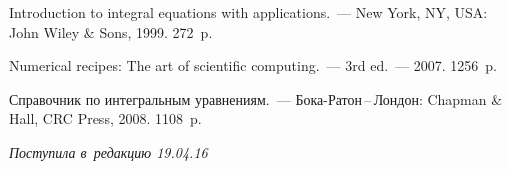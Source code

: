 \begin{multicols}{2}
{{\begin{thebibliography}{9}
%
%
%
%
%
%
%
%
Introduction to integral equations with
applications.~--- New York, NY, USA: John Wiley \& Sons, 1999. 272~p.

Numerical recipes:
The art of scientific computing.~--- 3rd ed.~---
 2007. 1256~p.

Справочник по интегральным уравнениям.~---
Бока-Ратон\,--\,Лондон: Chapman \& Hall, CRC Press, 2008. 1108~p.


\end{thebibliography}

 }
 }

\end{multicols}

\vspace*{-6pt}

\hfill{\small\textit{Поступила в~редакцию 19.04.16}}

